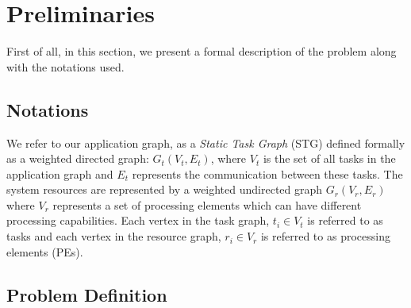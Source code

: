 \documentclass[10pt, conference, compsocconf]{IEEEtran}
\begin{document}
%
\IEEEpeerreviewmaketitle





\section{Preliminaries}
\label{sec:preliminaries}

First of all, in this section, we present a formal description of the
problem along with the notations used.

\subsection{Notations}

We refer to our application graph, as a \textit{Static Task Graph} (STG)
defined formally as a weighted directed graph: $G_t(V_t, E_t)$, where
$V_t$ is the set of all tasks in the application graph and $E_t$
represents the communication between these tasks. The system resources
are represented by a weighted undirected graph $G_r(V_r, E_r)$ where
$V_r$ represents a set of processing elements which can have different
processing capabilities. Each vertex in the task graph, $t_i \in V_t$ is
referred to as tasks and each vertex in the resource graph, $r_i \in
V_r$ is referred to as processing elements (PEs). %

\subsection{Problem Definition}
\end{document}

